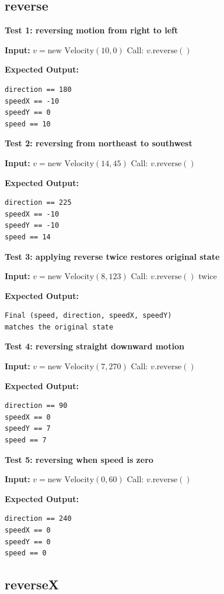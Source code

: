 \subsection*{reverse}

\textbf{Test 1: reversing motion from right to left}

\textbf{Input:}  
$v = \text{new Velocity}(10, 0)$  
Call: $v.\text{reverse}()$

\textbf{Expected Output:}
\begin{verbatim}
direction == 180
speedX == -10
speedY == 0
speed == 10
\end{verbatim}

\textbf{Test 2: reversing from northeast to southwest}

\textbf{Input:}  
$v = \text{new Velocity}(14, 45)$  
Call: $v.\text{reverse}()$

\textbf{Expected Output:}
\begin{verbatim}
direction == 225
speedX == -10
speedY == -10
speed == 14
\end{verbatim} 

\textbf{Test 3: applying reverse twice restores original state}

\textbf{Input:}  
$v = \text{new Velocity}(8, 123)$  
Call: $v.\text{reverse}()$ twice

\textbf{Expected Output:}
\begin{verbatim}
Final (speed, direction, speedX, speedY)
matches the original state
\end{verbatim}

\textbf{Test 4: reversing straight downward motion}

\textbf{Input:}  
$v = \text{new Velocity}(7, 270)$  
Call: $v.\text{reverse}()$

\textbf{Expected Output:}
\begin{verbatim}
direction == 90
speedX == 0
speedY == 7
speed == 7
\end{verbatim}

\textbf{Test 5: reversing when speed is zero}

\textbf{Input:}  
$v = \text{new Velocity}(0, 60)$  
Call: $v.\text{reverse}()$

\textbf{Expected Output:}
\begin{verbatim}
direction == 240
speedX == 0
speedY == 0
speed == 0
\end{verbatim}

\subsection*{reverseX}

